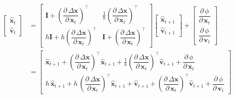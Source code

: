 \documentclass{article}
\newcommand{\pd}[2]{\dfrac{\partial\, #1}{\partial\, #2}}
\begin{document}
\begin{equation}
\begin{aligned}
\begin{bmatrix}
    \displaystyle \hat{\mathbf{x}}_t \\[2ex]
    \displaystyle \hat{\mathbf{v}}_t
\end{bmatrix} 
&= 
\begin{bmatrix}
    \displaystyle \mathbf{I} + \left(\pd{\Delta \mathbf{x}}{\mathbf{x}_t}\right)^\top & 
    \displaystyle \frac{1}{h} \left(\pd{\Delta \mathbf{x}}{\mathbf{x}_t}\right)^\top
     \\[2.5ex]
    \displaystyle h\mathbf{I} + h\left(\pd{\Delta \mathbf{x}}{\mathbf{x}_t}\right)^\top & 
    \displaystyle \mathbf{I} + \left(\pd{\Delta \mathbf{x}}{\mathbf{x}_t}\right)^\top
\end{bmatrix}
\begin{bmatrix}
    \displaystyle \hat{\mathbf{x}}_{t+1} \\[2ex]
    \displaystyle \hat{\mathbf{v}}_{t+1}
\end{bmatrix} +
\begin{bmatrix}
    \displaystyle \pd{\phi}{\mathbf{x}_{t}} \\[2ex]
    \displaystyle \pd{\phi}{\mathbf{v}_{t}}
\end{bmatrix} \\[2ex]
&= 
\begin{bmatrix}
    \displaystyle 
        \hat{\mathbf{x}}_{t+1} + 
         \left(\pd{\Delta \mathbf{x}}{\mathbf{x}_t}\right)^\top \hat{\mathbf{x}}_{t+1} + 
        \frac{1}{h}  \left(\pd{\Delta \mathbf{x}}{\mathbf{x}_t}\right)^\top \hat{\mathbf{v}}_{t+1} +
        \pd{\phi}{\mathbf{x}_{t}} \\[2ex]
    \displaystyle  
        h\, \hat{\mathbf{x}}_{t+1} + 
        h\, \left(\pd{\Delta \mathbf{x}}{\mathbf{x}_t}\right)^\top \hat{\mathbf{x}}_{t+1} + 
        \hat{\mathbf{v}}_{t+1} + 
        \left(\pd{\Delta \mathbf{x}}{\mathbf{x}_t}\right)^\top  \hat{\mathbf{v}}_{t+1} + 
        \pd{\phi}{\mathbf{v}_{t}}
\end{bmatrix}
\end{aligned}
\end{equation}
\end{document}
